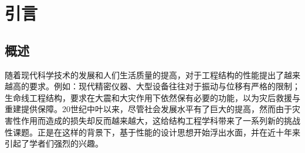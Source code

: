\documentclass[degree=master,degreetype=profession]{tongjithesis}
\begin{document}
\graphicspath{{figures/}}
\frontmatter\makecover
\mainmatter
\chapter{引言}\section{概述}
随着现代科学技术的发展和人们生活质量的提高，对于工程结构的性能提出了越来越高的要求。例如：现代精密仪器、大型设备往往对于振动与位移有严格的限制；生命线工程结构，要求在大震和大灾作用下依然保有必要的功能，以为灾后救援与重建提供保障。20世纪中叶以来，尽管社会发展水平有了巨大的提高，然而由于灾害性作用而造成的损失却反而越来越大，这给结构工程学科带来了一系列新的挑战性课题。正是在这样的背景下，基于性能的设计思想开始浮出水面，并在近十年来引起了学者们强烈的兴趣。
\makeatletter
\def\tongji@cheadingtitlenew{{\fontspec{SimSun.ttf}[Path=fonts/]X\allowbreak X\allowbreak X\allowbreak X\allowbreak X\allowbreak X\allowbreak X\allowbreak X\allowbreak X\allowbreak X\allowbreak X\allowbreak X\allowbreak X\allowbreak X\allowbreak X\allowbreak X\allowbreak X\allowbreak X\allowbreak X\allowbreak X\allowbreak X\allowbreak X\allowbreak X\allowbreak X\allowbreak X\allowbreak X\allowbreak X\allowbreak X\allowbreak X\allowbreak X\allowbreak X\allowbreak X\allowbreak X\allowbreak X\allowbreak X\allowbreak X\allowbreak X\allowbreak X\allowbreak X\allowbreak X\allowbreak X\allowbreak X\allowbreak X\allowbreak X\allowbreak X\allowbreak X\allowbreak X\allowbreak X\allowbreak X\allowbreak X\allowbreak X\allowbreak X\allowbreak X\allowbreak X\allowbreak X\allowbreak X\allowbreak X\allowbreak X\allowbreak X\allowbreak X\allowbreak X\allowbreak X\allowbreak X\allowbreak X\allowbreak X\allowbreak X\allowbreak X\allowbreak X\allowbreak X\allowbreak X\allowbreak X\allowbreak X\allowbreak X\allowbreak X\allowbreak X\allowbreak X\allowbreak X\allowbreak X\allowbreak X\allowbreak X\allowbreak X\allowbreak }}
\makeatother
\begin{statements}\end{statements}
\end{document}
